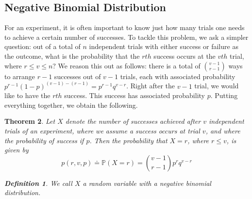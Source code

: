 \documentclass[12pt,reqno]{amsart}
\numberwithin{equation}{section}  %
\newtheorem{theorem}{Theorem}[section]
\newtheorem{definition}[theorem]{Definition}
\begin{document}
\subsection{Negative Binomial Distribution}
For an experiment, it is often important to know just how many trials
one needs to achieve a certain number of successes. To tackle this problem,
we ask a simpler question: out of a total of $n$ independent trials with
either success or failure as the outcome, what is the probability
that the $rth$ success occurs at the $vth$ trial, where $r \le v \le n$?
We reason this out as follows: there is a total of $\binom{v-1}{r-1}$ ways to
arrange $r-1$ successes out of $v-1$ trials, each with associated probability
$p^{r-1}(1 - p)^{(v-1) - (r-1)} = p^{r-1}q^{v-r}$. Right after the $v-1$ trial, we would like to
have the $rth$ success. This success has associated probability $p$. Putting
everything together, we obtain the following.
\begin{theorem}
Let $X$ denote the number of successes achieved after $v$ independent trials of an experiment,
where we assume a success occurs at trial $v$, and where the probability
of success if $p$. Then the probability that $X=r$, where $r \le v$, is given by
\begin{equation*}
p(r, v, p) \doteq \mathbb{P}(X = r) = \binom{v-1}{r-1} p^{r} q^{v-r}
\end{equation*}
\begin{definition}
We call $X$ a random variable with a \emph{negative binomial distribution}.
\end{definition}
\end{theorem}
\end{document}
